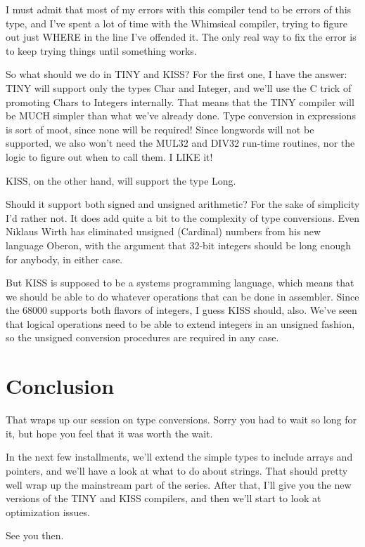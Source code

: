 I must admit that most of my errors with this compiler tend to be errors of this type, and  I've  spent  a  lot  of  time  with the Whimsical compiler, trying to figure out just WHERE  in  the line I've offended it. The only real way to fix the error is to keep trying things until something works.

So what should we do in TINY and KISS?  For the first one, I have the answer:  TINY  will  support only the types Char and Integer, and  we'll  use  the  C  trick  of  promoting Chars  to  Integers internally. That means  that  the  TINY  compiler will be  MUCH  simpler  than  what  we've  already  done. Type conversion  in expressions is sort of moot, since none will be required!   Since longwords will not be supported, we also won't need the MUL32 and DIV32 run-time routines, nor the logic to figure out when to call them. I  LIKE  it!

KISS, on the other hand, will support the type Long.

Should it support both signed and unsigned arithmetic?    For the sake of simplicity I'd rather not. It  does add quite a bit to the  complexity  of  type conversions. Even  Niklaus  Wirth  has eliminated  unsigned  (Cardinal) numbers from  his  new  language Oberon, with the argument that  32-bit  integers  should  be long enough for anybody, in either case.

But KISS is supposed to  be a systems programming language, which means that we should  be  able to do whatever operations that can be done in assembler. Since the 68000 supports both flavors of integers, I guess KISS  should, also. We've seen that logical operations  need to be able to extend  integers  in  an  unsigned fashion, so the unsigned conversion  procedures  are  required in any case.

\section{Conclusion}

That wraps up our session on type conversions. Sorry you  had to wait  so  long for it, but hope you feel that it  was  worth  the wait.

In  the  next  few installments, we'll extend the simple types to include arrays and pointers, and we'll have a look at what  to do about  strings. That should pretty well wrap up the mainstream part of the series. After  that, I'll give you the new versions of the TINY and KISS compilers, and  then we'll start to look at optimization issues.

See you then.
